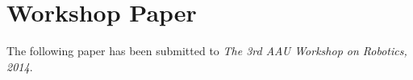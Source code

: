 \chapter{Workshop Paper}
\label{ch:paper}

The following paper has been submitted to \textit{The 3rd AAU
Workshop on Robotics, 2014}.




